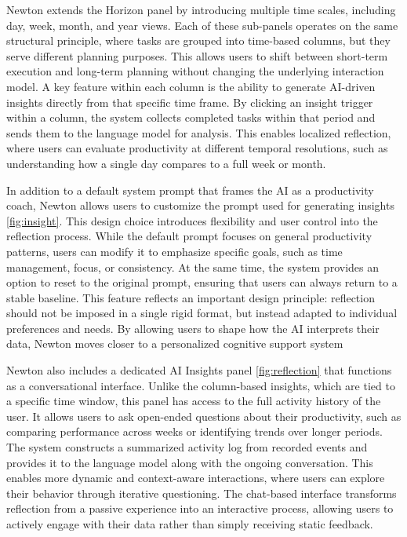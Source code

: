 \documentclass[12pt]{article}
\begin{document}
  Newton extends the Horizon panel by introducing multiple time scales, including day, week, month, and year views. Each of these 
  sub-panels operates on the same structural principle, where tasks are grouped into time-based columns, but they serve different 
  planning purposes. This allows users to shift between short-term execution and long-term planning without changing the underlying
   interaction model. A key feature within each column is the ability to generate AI-driven insights directly from that specific
    time frame. By clicking an insight trigger within a column, the system collects completed tasks within that period and sends 
    them to the language model for analysis. This enables localized reflection, where users can evaluate productivity at different 
    temporal resolutions, such as understanding how a single day compares to a full week or month.

In addition to a default system prompt that frames the AI as a productivity coach, Newton allows users to customize the prompt used 
for generating insights \ref{fig:insight}. This design choice introduces flexibility and user control into the reflection process. While the default
 prompt focuses on general productivity patterns, users can modify it to emphasize specific goals, such as time management, focus, 
 or consistency. At the same time, the system provides an option to reset to the original prompt, ensuring that users can always 
 return to a stable baseline. This feature reflects an important design principle: reflection should not be imposed in a single 
 rigid format, but instead adapted to individual preferences and needs. By allowing users to shape how the AI interprets their data,
  Newton moves closer to a personalized cognitive support system

  Newton also includes a dedicated AI Insights panel \ref{fig:reflection} that functions as a conversational interface. Unlike the column-based insights,
   which are tied to a specific time window, this panel has access to the full activity history of the user. It allows users to ask 
   open-ended questions about their productivity, such as comparing performance across weeks or identifying trends over longer
    periods. The system constructs a summarized activity log from recorded events and provides it to the language model along with 
    the ongoing conversation. This enables more dynamic and context-aware interactions, where users can explore their behavior
    through iterative questioning. The chat-based interface transforms reflection from a passive experience into an interactive 
    process, allowing users to actively engage with their data rather than simply receiving static feedback.
\end{document}

